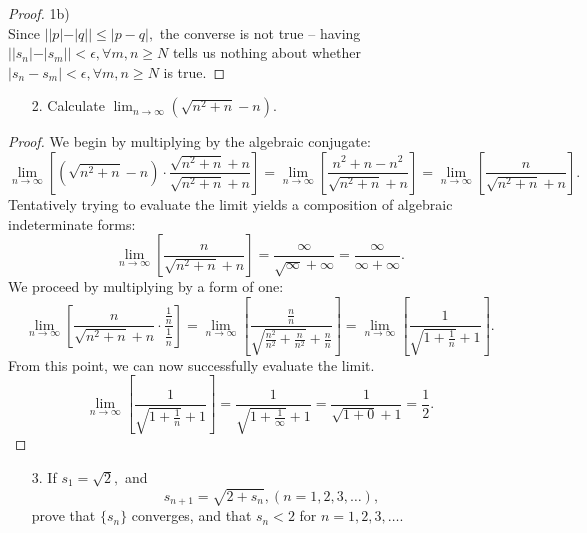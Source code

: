 \documentclass[10pt]{article}
\theoremstyle{definition}
\theoremstyle{plain}
\begin{document}
\begin{proof}
1b) \\

Since $||p| - |q|| \leq |p-q|,$ the converse is not true -- having $||s_n|-|s_m|| < \epsilon, \forall m,n\geq N$ tells us nothing about whether $|s_n-s_m| < \epsilon, \forall m,n\geq N$ is true.
\end{proof}


\pagebreak



\begin{enumerate}
\item[2.] Calculate $\lim_{n\rightarrow\infty} (\sqrt{n^2+n}-n)$.
\end{enumerate}

\begin{proof}
We begin by multiplying by the algebraic conjugate:
$$\lim_{n\rightarrow\infty} \left[(\sqrt{n^2+n}-n) \cdot \frac{\sqrt{n^2+n}+n}{\sqrt{n^2+n}+n}\right]=\lim_{n\rightarrow\infty} \left[ \frac{n^2+n-n^2}{\sqrt{n^2+n}+n}\right] = \lim_{n\rightarrow\infty} \left[ \frac{n}{\sqrt{n^2+n}+n}\right].$$
Tentatively trying to evaluate the limit yields a composition of algebraic indeterminate forms:
$$\lim_{n\rightarrow\infty} \left[\frac{n}{\sqrt{n^2+n}+n}\right] = \frac{\infty}{\sqrt{\infty}+\infty} = \frac{\infty}{\infty+\infty}.$$
We proceed by multiplying by a form of one:
$$\lim_{n\rightarrow\infty} \left[\frac{n}{\sqrt{n^2+n}+n} \cdot \frac{\frac{1}{n}}{\frac{1}{n}}\right] = \lim_{n\rightarrow\infty}  \left[\frac{\frac{n}{n}}{\sqrt{\frac{n^2}{n^2}+\frac{n}{n^2}}+\frac{n}{n}}\right]=\lim_{n\rightarrow\infty}  \left[\frac{1}{\sqrt{1+\frac{1}{n}}+1}\right].$$
From this point, we can now successfully evaluate the limit.
$$\lim_{n\rightarrow\infty}  \left[\frac{1}{\sqrt{1+\frac{1}{n}}+1}\right] = \frac{1}{\sqrt{1+\frac{1}{\infty}}+1} = \frac{1}{\sqrt{1+0}+1} = \frac{1}{2}.$$
\end{proof}



\pagebreak



\begin{enumerate}
\item[3.] If $s_1 = \sqrt{2},$ and
$$s_{n+1} =\sqrt{2+s_n}, (n=1,2,3,\dots),$$
prove that $\{s_n\}$ converges, and that $s_n<2$ for $n=1,2,3,\dots$.
\end{enumerate}
\end{document}
